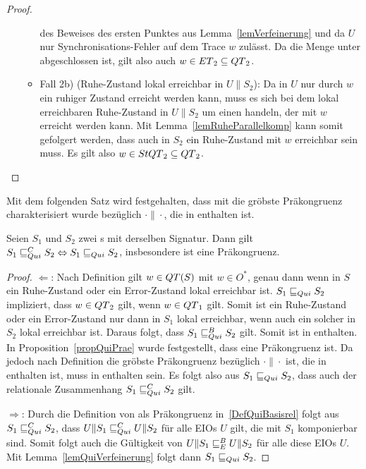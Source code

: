 \begin{proof}
\begin{itemize}
\begin{itemize}
          des Beweises des ersten Punktes aus Lemma~\ref{lemVerfeinerung} und
          da $U$ nur Synchronisations-Fehler auf dem Trace $w$ zulässt. Da
          die Menge \ET{} unter \cont{} abgeschlossen ist, gilt also auch $w\in
          ET{}_2\subseteq QT{}_2$.
        \item Fall 2b) (Ruhe-Zustand lokal erreichbar in $U\|S_2$): Da in $U$
          nur durch $w$ ein ruhiger Zustand erreicht werden kann, muss es sich
          bei dem lokal erreichbaren Ruhe-Zustand in $U\|S_2$ um einen handeln,
          der mit $w$ erreicht werden kann. Mit Lemma~\ref{lemRuheParallelkomp}
          kann somit gefolgert werden, dass auch in $S_2$ ein Ruhe-Zustand mit
          $w$ erreichbar sein muss. Es gilt also $w\in StQT{}_2\subseteq
          QT{}_2$.
      \end{itemize}
  \end{itemize}
\end{proof}

Mit dem folgenden Satz wird festgehalten, dass mit \QRel{} die gröbste
Präkongruenz charakterisiert wurde bezüglich $\cdot\|\cdot$, die in \QBRel{}
enthalten ist.

\begin{satz}
  \label{satzQuiFullAbst}
  Seien $S_1$ und $S_2$ zwei \EIO{}s mit derselben Signatur. Dann gilt
  $S_1\sqsubseteq _{Qui}^C S_2\Leftrightarrow S_1\sqsubseteq _{Qui} S_2$, insbesondere ist \QRel{} eine
  Präkongruenz.
\end{satz}

\begin{proof}
  \glqq{}$\Leftarrow$\grqq{}: Nach Definition gilt $w\in QT{}(S)$ mit $w\in
  O^*$, genau dann wenn in $S$ ein Ruhe-Zustand oder ein Error-Zustand lokal
  erreichbar ist. $S_1\sqsubseteq _{Qui} S_2$ impliziert, dass $w\in QT{}_2$ gilt, wenn
  $w\in QT{}_1$ gilt. Somit ist ein Ruhe-Zustand oder ein Error-Zustand nur dann in
  $S_1$ lokal erreichbar, wenn auch ein solcher in $S_2$ lokal erreichbar ist.
  Daraus folgt, dass $S_1\sqsubseteq _{Qui}^B S_2$ gilt. Somit ist \QRel{} in \QBRel{}
  enthalten. In Proposition~\ref{propQuiPrae} wurde festgestellt, dass \QRel{}
  eine Präkongruenz ist. Da jedoch \QCRel{} nach Definition die gröbste
  Präkongruenz bezüglich $\cdot\|\cdot$ ist, die in \QBRel{} enthalten ist,
  muss \QRel{} in \QCRel{} enthalten sein. Es folgt also aus $S_1\sqsubseteq _{Qui} S_2$,
  dass auch der relationale Zusammenhang $S_1\sqsubseteq _{Qui}^C S_2$ gilt.

  \glqq{}$\Rightarrow$\grqq{}: Durch die Definition von \QCRel{} als
  Präkongruenz in~\ref{DefQuiBasisrel} folgt aus $S_1\sqsubseteq _{Qui}^C{} S_2$, dass
  $U\|S_1\sqsubseteq _{Qui}^C U\|S_2$ für alle EIOs $U$ gilt, die mit $S_1$ komponierbar sind.
  Somit folgt auch die Gültigkeit von $U\|S_1\sqsubseteq _E^B U\|S_2$ für alle diese EIOs
  $U$. Mit Lemma~\ref{lemQuiVerfeinerung} folgt dann $S_1\sqsubseteq _{Qui}{} S_2$.
\end{proof}

